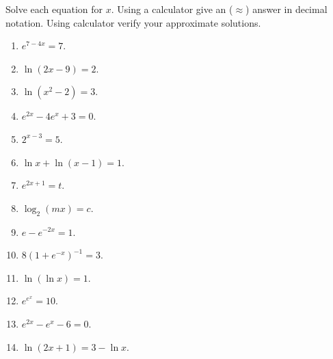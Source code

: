 Solve each equation for $x$. Using a calculator give an ($\approx$) answer in decimal notation. Using calculator verify your approximate solutions.
\begin{multicols}{2}
\begin{enumerate}
\item $e^{7-4x}=7$.

\item $\ln (2x-9)=2$.

\item $\ln (x^2-2)=3$.

\item $e^{2x}-4e^x+3=0$.

\item $2^{x-3}=5$.

\item $\ln x+\ln (x-1)=1$.

\item $e^{2x+1}=t$.

\item $\log_2(m x)=c$.

\item $e- e^{-2x}=1$.

\item $8(1+e^{-x})^{-1}=3$.

\item $\ln (\ln x)=1$.

\item $e^{e^x}=10$.

\item $e^{2x}-e^x-6=0$.

\item $\ln(2x+1)=3-\ln x$.

\end{enumerate}
\end{multicols}


